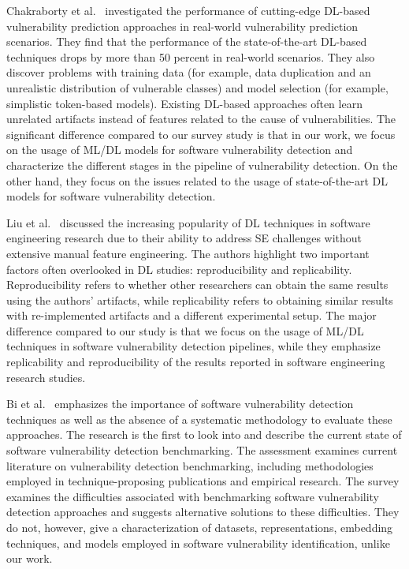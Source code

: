 Chakraborty et al.~\cite{chakraborty2021deep} investigated the performance of cutting-edge DL-based vulnerability prediction approaches in real-world vulnerability prediction scenarios. They find that the performance of the state-of-the-art DL-based techniques drops by more than 50 percent in real-world scenarios. They also discover problems with training data (for example, data duplication and an unrealistic distribution of vulnerable classes) and model selection (for example, simplistic token-based models). Existing DL-based approaches often learn unrelated artifacts instead of features related to the cause of vulnerabilities. The significant difference compared to our survey study is that in our work, we focus on the usage of ML/DL models for software vulnerability detection and characterize the different stages in the pipeline of vulnerability detection. On the other hand, they focus on the issues related to the usage of state-of-the-art DL models for software vulnerability detection. 

Liu et al.~\cite{liu2021reproducibility} discussed the increasing popularity of DL techniques in software engineering research due to their ability to address SE challenges without extensive manual feature engineering. The authors highlight two important factors often overlooked in DL studies: reproducibility and replicability. Reproducibility refers to whether other researchers can obtain the same results using the authors' artifacts, while replicability refers to obtaining similar results with re-implemented artifacts and a different experimental setup. The major difference compared to our study is that we focus on the usage of ML/DL techniques in software vulnerability detection pipelines, while they emphasize replicability and reproducibility of the results reported in software engineering research studies. 

Bi et al.~\cite{bi2023benchmarking} emphasizes the importance of software vulnerability detection techniques as well as the absence of a systematic methodology to evaluate these approaches. The research is the first to look into and describe the current state of software vulnerability detection benchmarking. The assessment examines current literature on vulnerability detection benchmarking, including methodologies employed in technique-proposing publications and empirical research. The survey examines the difficulties associated with benchmarking software vulnerability detection approaches and suggests alternative solutions to these difficulties. They do not, however, give a characterization of datasets, representations, embedding techniques, and models employed in software vulnerability identification, unlike our work.









